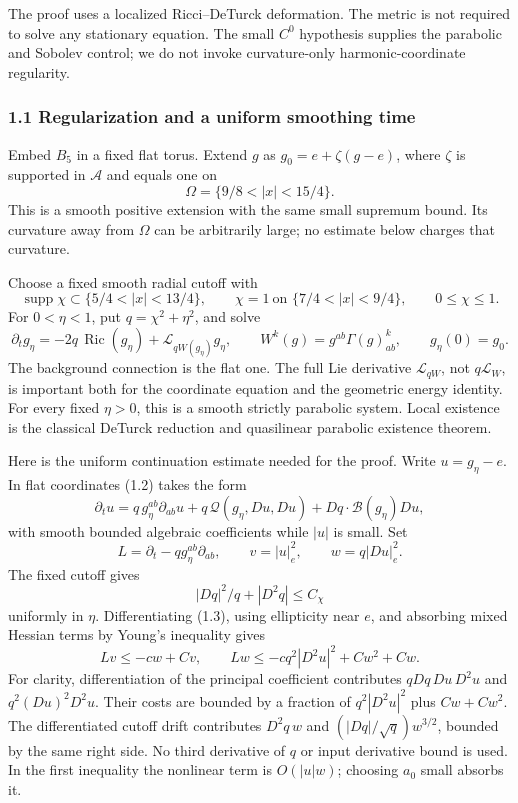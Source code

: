 \documentclass[
  10pt,
]{article}
\begin{document}
The proof uses a localized Ricci--DeTurck deformation. The metric is not
required to solve any stationary equation. The small \(C^0\) hypothesis
supplies the parabolic and Sobolev control; we do not invoke
curvature-only harmonic-coordinate regularity.

\hypertarget{regularization-and-a-uniform-smoothing-time}{%
\subsubsection{1.1 Regularization and a uniform smoothing
time}\label{regularization-and-a-uniform-smoothing-time}}

Embed \(B_5\) in a fixed flat torus. Extend \(g\) as
\(g_0=e+\zeta(g-e)\), where \(\zeta\) is supported in \(\mathcal A\) and
equals one on \[
 \Omega=\{9/8<|x|<15/4\}.
\] This is a smooth positive extension with the same small supremum
bound. Its curvature away from \(\Omega\) can be arbitrarily large; no
estimate below charges that curvature.

Choose a fixed smooth radial cutoff with \[
 \operatorname{supp}\chi\subset\{5/4<|x|<13/4\},\qquad
 \chi=1\ \text{on }\{7/4<|x|<9/4\},\qquad 0\le\chi\le1 .
\] For \(0<\eta<1\), put \(q=\chi^2+\eta^2\), and solve \[
 \partial_tg_\eta=-2q\,\operatorname{Ric}(g_\eta)
                    +\mathcal L_{qW(g_\eta)}g_\eta,\qquad
 W^k(g)=g^{ab}\Gamma(g)^k_{ab},\qquad g_\eta(0)=g_0.   \tag{1.2}
\] The background connection is the flat one. The full Lie derivative
\(\mathcal L_{qW}\), not \(q\mathcal L_W\), is important both for the
coordinate equation and the geometric energy identity. For every fixed
\(\eta>0\), this is a smooth strictly parabolic system. Local existence
is the classical DeTurck reduction and quasilinear parabolic existence
theorem.

Here is the uniform continuation estimate needed for the proof. Write
\(u=g_\eta-e\). In flat coordinates (1.2) takes the form \[
 \partial_tu=q\,g_\eta^{ab}\partial_{ab}u
             +q\,\mathcal Q(g_\eta,Du,Du)
             +Dq\cdot\mathcal B(g_\eta)Du,              \tag{1.3}
\] with smooth bounded algebraic coefficients while \(|u|\) is small.
Set \[
 L=\partial_t-qg_\eta^{ab}\partial_{ab},\qquad
 v=|u|_e^2,\qquad w=q|Du|_e^2 .
\] The fixed cutoff gives \[
 |Dq|^2/q+|D^2q|\le C_\chi
\] uniformly in \(\eta\). Differentiating (1.3), using ellipticity near
\(e\), and absorbing mixed Hessian terms by Young's inequality gives \[
 Lv\le-cw+Cv,\qquad
 Lw\le-cq^2|D^2u|^2+Cw^2+Cw.                         \tag{1.4}
\] For clarity, differentiation of the principal coefficient contributes
\(qDq\,Du\,D^2u\) and \(q^2(Du)^2D^2u\). Their costs are bounded by a
fraction of \(q^2|D^2u|^2\) plus \(Cw+Cw^2\). The differentiated cutoff
drift contributes \(D^2q\,w\) and \((|Dq|/\sqrt q)w^{3/2}\), bounded by
the same right side. No third derivative of \(q\) or input derivative
bound is used. In the first inequality the nonlinear term is
\(O(|u|w)\); choosing \(a_0\) small absorbs it.
\end{document}
